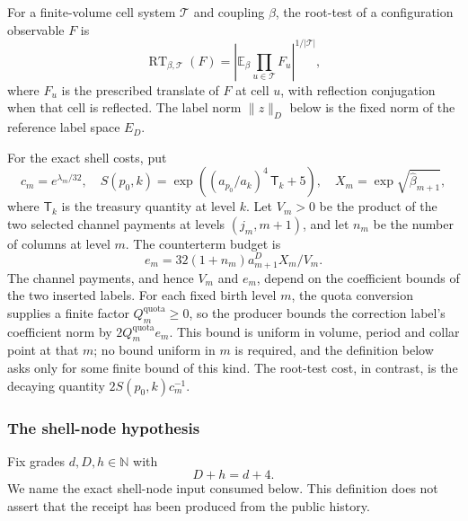 For a finite-volume cell system $\mathcal T$ and coupling $\beta$, the
root-test of a configuration observable $F$ is
\[
 \operatorname{RT}_{\beta,\mathcal T}(F)
 =\left|\mathbb E_\beta\prod_{u\in\mathcal T}F_u\right|^{1/|\mathcal T|},
\]
where $F_u$ is the prescribed translate of $F$ at cell $u$, with
reflection conjugation when that cell is reflected.  The label norm
$\|z\|_D$ below is the fixed norm of the reference label space $E_D$.

For the exact shell costs, put
\[
 c_m=e^{\lambda_m/32},\quad
 S(p_0,k)=\exp\!\left((a_{p_0}/a_k)^4\,\mathsf T_k+5\right),\quad
 X_m=\exp\!\sqrt{\widehat\beta_{m+1}},
\]
where $\mathsf T_k$ is the treasury quantity at level $k$.  Let $V_m>0$ be
the product of the two selected channel payments at levels $(j_m,m+1)$, and
let $n_m$ be the number of columns at level $m$.  The counterterm budget is
\[
 e_m=32(1+n_m)a_{m+1}^{D}X_m/V_m.
\]
The channel payments, and hence $V_m$ and $e_m$, depend on the
coefficient bounds of the two inserted labels.  For each fixed birth level
$m$, the quota conversion supplies a finite factor
$Q_m^{\mathrm{quota}}\ge0$, so the producer bounds the correction label's
coefficient norm by $2Q_m^{\mathrm{quota}}e_m$. This bound is uniform in
volume, period and collar point at that $m$; no bound uniform in $m$ is
required, and the definition below asks only for some finite bound of this
kind.  The root-test cost, in contrast, is the
decaying quantity $2S(p_0,k)c_m^{-1}$.

\subsubsection{The shell-node hypothesis}

Fix grades $d,D,h\in\mathbb N$ with
\begin{equation}\label{eq:ex-lattice-stress-grade}
  D+h=d+4.
\end{equation}
We name the exact shell-node input consumed below.  This definition does not
assert that the receipt has been produced from the public history.

